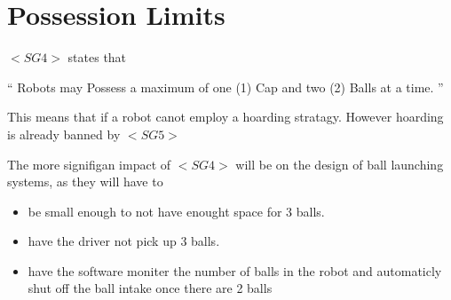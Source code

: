 \documentclass[../main.tex]{subfiles}
\begin{document}
\section{Possession Limits}

$<SG4>$ states that

`` Robots may Possess a maximum of one (1) Cap 
and two (2) Balls at a time. ''
\par

This means that if a robot canot employ a hoarding stratagy.
However hoarding is already banned by $<SG5>$ \par

The more signifigan impact of $<SG4>$ will be on the design of
ball launching systems, as they will have to

\begin{itemize}
    \item be small enough to not have enought space for 3 balls.
    \item have the driver not pick up 3 balls.
    \item have the software moniter the number of balls in the robot
          and automaticly shut off the ball intake once there are 2 balls
\end{itemize}
\end{document}
